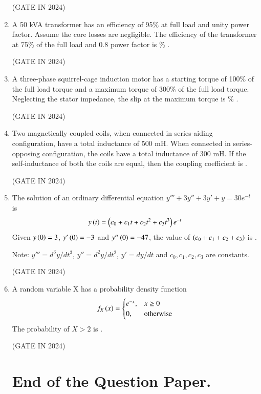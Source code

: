 \documentclass[journal,12pt,onecolumn]{IEEEtran}
\theoremstyle{remark}
\begin{document}
\begin{enumerate}
    \hfill{(GATE IN 2024)}
    
    \item A 50 kVA transformer has an efficiency of 95\% at full load and unity power factor. Assume the core losses are negligible. The efficiency of the transformer at 75\% of the full load and 0.8 power factor is \underline{\hspace{2cm}} \% .
    
    \hfill{(GATE IN 2024)}
    
    \item A three-phase squirrel-cage induction motor has a starting torque of 100\% of the full load torque and a maximum torque of 300\% of the full load torque. Neglecting the stator impedance, the slip at the maximum torque is \underline{\hspace{2cm}} \% .
    
    \hfill{(GATE IN 2024)}
    
    \item Two magnetically coupled coils, when connected in series-aiding configuration, have a total inductance of 500 mH. When connected in series-opposing configuration, the coils have a total inductance of 300 mH. If the self-inductance of both the coils are equal, then the coupling coefficient is \underline{\hspace{2cm}} .
    
    \hfill{(GATE IN 2024)}
    
    \item The solution of an ordinary differential equation $y''' + 3y'' + 3y' + y = 30e^{-t}$ is
    \begin{align*}
        y\left(t\right) = \left(c_0 + c_1 t + c_2 t^2 + c_3 t^3\right)e^{-t}
    \end{align*}
    Given $y\left(0\right) = 3$, $y'\left(0\right) = -3$ and $y''\left(0\right) = -47$, the value of $\left(c_0 + c_1 + c_2 + c_3\right)$ is \underline{\hspace{2cm}} .
    
    Note: $y''' = d^3y/dt^3$, $y'' = d^2y/dt^2$, $y' = dy/dt$ and $c_0, c_1, c_2, c_3$ are constants.
    
    \hfill{(GATE IN 2024)}
    
    \item A random variable X has a probability density function
    \begin{align*}
        f_X\left(x\right) = 
        \begin{cases}
            e^{-x}, & x \geq 0 \\
            0, & \text{otherwise}
        \end{cases}
    \end{align*}
    The probability of $X > 2$ is \underline{\hspace{2cm}} .
    
    \hfill{(GATE IN 2024)}

    \section*{End of the Question Paper.}
    
\end{enumerate}
\end{document}
